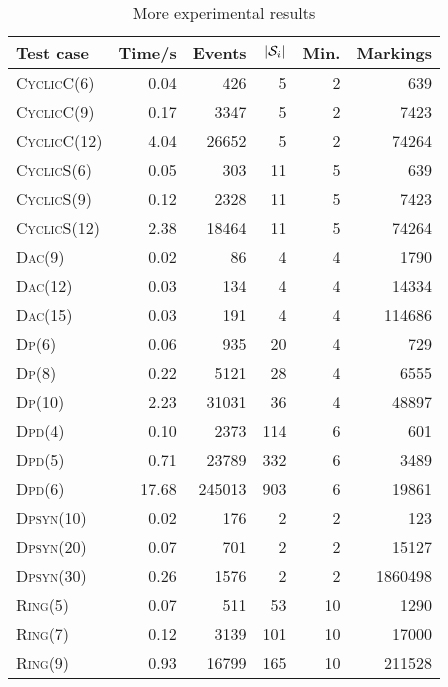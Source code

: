 \documentclass{llncs}
\def\S{\mathcal{S}}
\renewcommand{\S}{{\cal S}}
\begin{document}
\begin{table}[ht]
\begin{center}
\setlength\tabcolsep{5pt}
\begin{tabular}{lrrrrr}
\midrule
Test case & Time/s & Events & $|\S_i|$ & Min. & Markings \\
\toprule
\textsc{CyclicC}(6)  &  0.04  &   426 & 5 & 2 &    639 \\
\textsc{CyclicC}(9)  &  0.17  &  3347 & 5 & 2 &   7423 \\
\textsc{CyclicC}(12) &  4.04  & 26652 & 5 & 2 &  74264 \\
\midrule
\textsc{CyclicS}(6)  & 0.05 &   303 & 11 & 5 &    639 \\
\textsc{CyclicS}(9)  & 0.12 &  2328 & 11 & 5 &   7423 \\
\textsc{CyclicS}(12) & 2.38 & 18464 & 11 & 5 &  74264 \\
\midrule
\textsc{Dac}(9)  & 0.02 &  86 & 4 & 4 &   1790 \\
\textsc{Dac}(12) & 0.03 & 134 & 4 & 4 &  14334 \\
\textsc{Dac}(15) & 0.03 & 191 & 4 & 4 & 114686 \\
\midrule
\textsc{Dp}(6)  & 0.06 &    935 & 20 & 4 &   729 \\
\textsc{Dp}(8)  & 0.22 &   5121 & 28 & 4 &  6555 \\
\textsc{Dp}(10) & 2.23 &  31031 & 36 & 4 & 48897 \\
\midrule
\textsc{Dpd}(4) &  0.10 &   2373 & 114 & 6 &    601 \\
\textsc{Dpd}(5) &  0.71 &  23789 & 332 & 6 &   3489 \\
\textsc{Dpd}(6) & 17.68 & 245013 & 903 & 6 &  19861 \\
\midrule
\textsc{Dpsyn}(10) & 0.02 &  176 & 2 & 2 &     123 \\
\textsc{Dpsyn}(20) & 0.07 &  701 & 2 & 2 &   15127 \\
\textsc{Dpsyn}(30) & 0.26 & 1576 & 2 & 2 & 1860498 \\
\midrule
\textsc{Ring}(5) & 0.07 &   511 &  53 & 10 &   1290 \\
\textsc{Ring}(7) & 0.12 &  3139 & 101 & 10 &  17000 \\
\textsc{Ring}(9) & 0.93 & 16799 & 165 & 10 & 211528 \\
\end{tabular}
\caption{More experimental results}
\label{tab:expfull}
\end{center}
\end{table}
\end{document}
